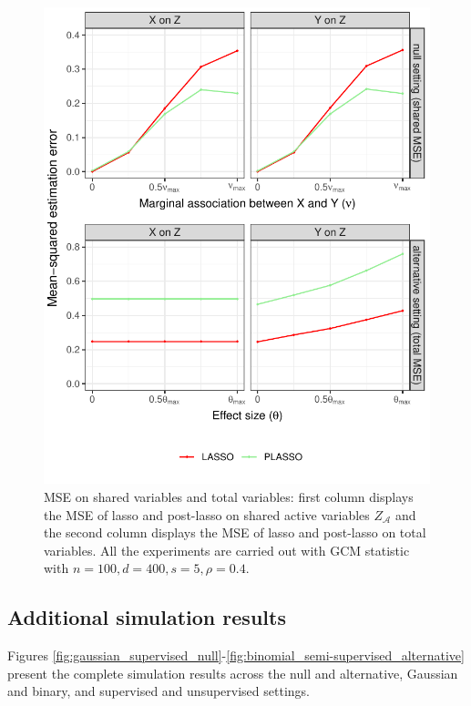 \documentclass[12pt]{article}
\theoremstyle{definition}
\theoremstyle{remark}
\begin{document}
\begin{figure}[!ht]
	\centering
	\includegraphics[scale = 1]{figures/MSE.pdf}
	\caption{MSE on shared variables and total variables: first column displays the MSE of lasso and post-lasso on shared active variables $Z_{\mathcal{A}}$ and the second column displays the MSE of lasso and post-lasso on total variables. All the experiments are carried out with GCM statistic with $n=100,d=400,s=5,\rho=0.4$.}
	\label{fig:MSE}
\end{figure}

\subsection{Additional simulation results} \label{sec:additional-simulation-results}

Figures \ref{fig:gaussian_supervised_null}-\ref{fig:binomial_semi-supervised_alternative} present the complete simulation results across the null and alternative, Gaussian and binary, and supervised and unsupervised settings.
\end{document}
